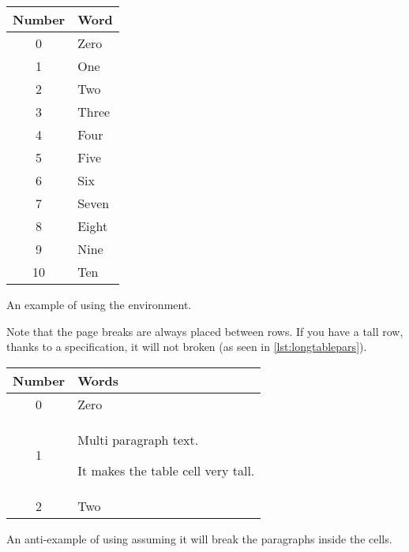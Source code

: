 \begin{listing}
  \begin{lined}{0.8\linewidth}
    \begin{example}[standalone, to_page=2, paperwidth=4.5cm, paperheight=3.5cm, vertical_pages]
\geometry{margin=0.1cm}
\usepackage{longtable}
\usepackage{booktabs}

\begin{longtable}{cl}
  \toprule
  Number & Word \\
  \midrule
  0      & Zero \\
  1      & One  \\
  2      & Two  \\
  3      & Three \\
  4      & Four  \\
  5      & Five  \\
  6      & Six   \\
  7      & Seven \\
  8      & Eight \\
  9      & Nine  \\
  10     & Ten  \\
  \bottomrule
\end{longtable}
\end{example}
  \end{lined}
  \caption{An example of using the  environment.}\label{lst:longtable}
\end{listing}

Note that the page breaks are always placed between rows. If you have a tall
row, thanks to a  specification, it will not broken (as seen in
\autoref{lst:longtablepars}).
\begin{listing}
  \begin{lined}{12cm}
    \begin{example}[standalone, to_page=3, paperwidth=5.5cm, paperheight=2cm, vertical_pages]
\usepackage{longtable}
\usepackage{booktabs}

\begin{longtable}{
  cp{2cm}
}
  \toprule
  Number & Words              \\
  \midrule
  0      & Zero               \\
  1      & Multi paragraph
           text.

           It makes the table
           cell very tall.    \\
  2      & Two                \\
  \bottomrule
\end{longtable}
\end{example}
  \end{lined}

  \caption{An anti-example of using  assuming it will break
    the paragraphs inside the cells.}\label{lst:longtablepars}
\end{listing}

